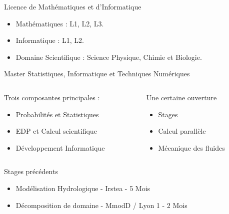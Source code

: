 \documentclass{beamer}
\begin{document}
\begin{frame}
  \begin{block}{Licence de Mathématiques et d'Informatique}
    \begin{itemize}
      \item Mathématiques : L1, L2, L3.
      \item Informatique : L1, L2.
      \item Domaine Scientifique : Science Physique, Chimie et Biologie.
    \end{itemize}
  \end{block}

  \begin{block}{Master Statistiques, Informatique et Techniques Numériques}
    \begin{columns}[t]

      \begin{column}{5.5cm}
        Trois composantes principales :
        \begin{itemize}
          \item Probabilités et Statistiques
          \item EDP et Calcul scientifique
          \item Développement Informatique
        \end{itemize}
      \end{column}

      \begin{column}{4.5cm}
        Une certaine ouverture  
        \begin{itemize}
          \item \alert{Stages}
          \item Calcul parallèle
          \item Mécanique des fluides
        \end{itemize}
      \end{column}
    \end{columns}  
  \end{block}

    \begin{block}{Stages précédents}
      \begin{itemize}
        \item Modélisation Hydrologique - Irstea - 5 Mois
        \item Décomposition de domaine - MmodD / Lyon 1 - 2 Mois
      \end{itemize}
  \end{block}

\end{frame}
\end{document}
